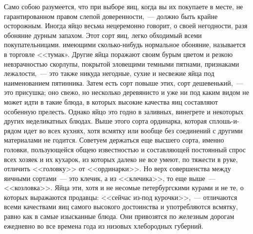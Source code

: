 Само собою разумеется, что при выборе яиц, когда вы их покупаете в месте, не гарантированном правом слепой доверенности,~--- должно быть крайне осторожным. Иногда яйцо весьма нецеремонно говорит, о своей негодности, разя обоняние дурным запахом. Этот сорт яиц, легко обходимый всеми покупательницами. имеющими сколько-нибудь нормальное обоняние, называется в торговле <<тумак». Другие яйца поражают своим бурым цветом и резкою невзрачностью скорлупы, покрытой зловещими темными пятнами, признаками лежалости,~--- это также никуда негодные, сухие и несвежие яйца под наименованием пятинника. Затем есть сорт повыше этих, сорт дешевенький,~--- это присушка; оно свежо, но несколько деревянисто и уже ни под каким видом не может идти в такие блюда, в которых высокие качества яиц составляют особенную прелесть. Однако яйцо это годно в заливных, винегрете и некоторых других неделикатных блюдах. Выше этого сорта ординарка, которая сплошь-и-рядом идет во всех кухнях, хотя всмятку или вообще без соединений с другими материалами не годится. Советуем держаться еще высшего сорта, именно головки, пользующейся общею известностью и составляющей постоянный спрос всех хозяек и их кухарок, из которых далеко не все умеют, по тяжести в руке, отличить <<головку>> от <<ординарки>>. Но верх совершенства между яичными сортами~--- это клечик, а из <<клечика>>, то еще выше~--- <<козловка>>. Яйца эти, хотя и не несомые петербургскими курами и не те, о которых выражаются продавцы: <<сейчас из-под курочки>>,~--- отличаются всеми качествами яиц самого высокого достоинства и употребляются всмятку, равно как в самые изысканные блюда. Они привозятся по железным дорогам ежедневно во все времена года из низовых хлебородных губерний.


